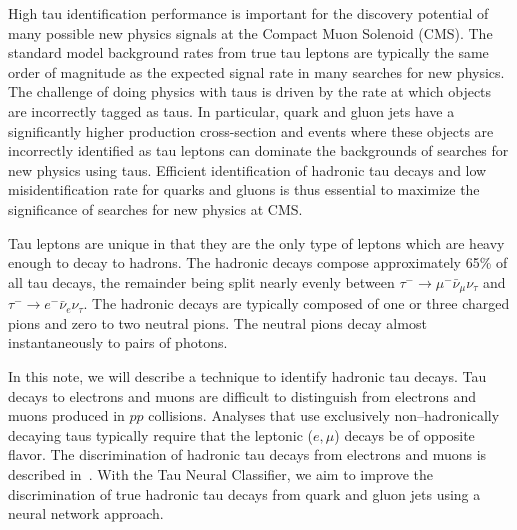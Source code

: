High tau identification performance is important for the discovery potential of
many possible new physics signals at the Compact Muon Solenoid (CMS).  The
standard model background rates from true tau leptons are typically the same
order of magnitude as the expected signal rate in many searches for new
physics.  The challenge of doing physics with taus is driven by the rate at
which objects are incorrectly tagged as taus.  In particular, quark and gluon
jets have a significantly higher production cross-section and events where
these objects are incorrectly identified as tau leptons can dominate the
backgrounds of searches for new physics using taus.  Efficient identification
of hadronic tau decays and low misidentification rate for quarks and gluons
is thus essential to maximize the significance of searches for new physics at
CMS.

Tau leptons are unique in that they are the only type of leptons which are heavy
enough to decay to hadrons.  The hadronic decays compose approximately 65\% of
all tau decays, the remainder being split nearly evenly between $\tau^{-}
\rightarrow \mu^{-} \bar \nu_\mu \nu_\tau$ and $\tau^{-} \rightarrow e^{-} \bar
\nu_e \nu_\tau$.  The hadronic decays are typically composed of one or three charged
pions and zero to two neutral pions.  The neutral pions decay almost
instantaneously to pairs of photons.

In this note, we will describe a technique to identify hadronic tau decays.  Tau
decays to electrons and muons are difficult to distinguish from electrons and
muons produced in $pp$ collisions.  Analyses that use exclusively
non--hadronically decaying taus typically require that the leptonic ($e,\mu$)
decays be of opposite flavor.  The discrimination of hadronic tau decays from
electrons and muons is described in~\cite{CMS-PAS-PFT-08-001}. With the Tau Neural
Classifier, we aim to improve the discrimination of true hadronic tau decays
from quark and gluon jets using a neural network approach.

